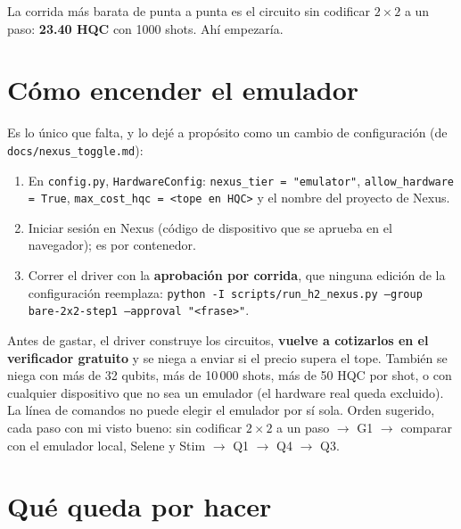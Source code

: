 \documentclass[11pt,a4paper]{article}
\begin{document}
La corrida m\'as barata de punta a punta es el circuito sin codificar $2{\times}2$ a un paso: \textbf{23.40 HQC}
con 1000 shots. Ah\'i empezar\'ia.

\section{C\'omo encender el emulador}\label{sec:encender}

Es lo \'unico que falta, y lo dej\'e a prop\'osito como un cambio de configuraci\'on (de \texttt{docs/nexus\_toggle.md}):
\begin{enumerate}[leftmargin=1.6em]
  \item En \texttt{config.py}, \texttt{HardwareConfig}: \texttt{nexus\_tier = "emulator"},
    \texttt{allow\_hardware = True}, \texttt{max\_cost\_hqc = <tope en HQC>} y el nombre del proyecto de Nexus.
  \item Iniciar sesi\'on en Nexus (c\'odigo de dispositivo que se aprueba en el navegador); es por
    contenedor.
  \item Correr el driver con la \textbf{aprobaci\'on por corrida}, que ninguna edici\'on de la configuraci\'on
    reemplaza: \texttt{python -I scripts/run\_h2\_nexus.py --group bare-2x2-step1 --approval "<frase>"}.
\end{enumerate}
Antes de gastar, el driver construye los circuitos, \textbf{vuelve a cotizarlos en el verificador gratuito} y se
niega a enviar si el precio supera el tope. Tambi\'en se niega con m\'as de 32 qubits, m\'as de 10\,000 shots,
m\'as de 50 HQC por shot, o con cualquier dispositivo que no sea un emulador (el hardware real queda
excluido). La l\'inea de comandos no puede elegir el emulador por s\'i sola. Orden sugerido, cada paso con mi
visto bueno: sin codificar $2{\times}2$ a un paso $\to$ G1 $\to$ comparar con el emulador local, Selene y Stim
$\to$ Q1 $\to$ Q4 $\to$ Q3.

\section{Qu\'e queda por hacer}\label{sec:queda}
\end{document}
